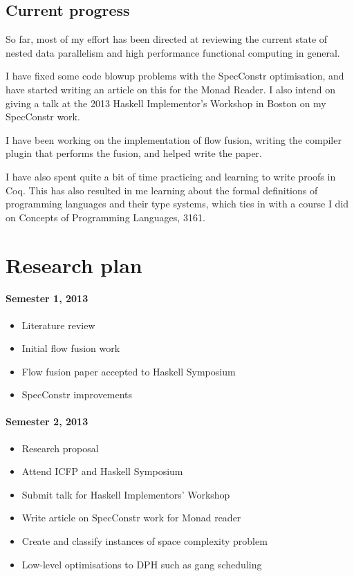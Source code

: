 \documentclass[12pt,a4paper]{article}
\begin{document}
\subsection{Current progress}

So far, most of my effort has been directed at reviewing the current state of nested data parallelism and high performance functional computing in general.

I have fixed some code blowup problems with the SpecConstr optimisation, and have started writing an article on this for the Monad Reader.
I also intend on giving a talk at the 2013 Haskell Implementor's Workshop in Boston on my SpecConstr work.

I have been working on the implementation of flow fusion, writing the compiler plugin that performs the fusion, and helped write the paper\cite{lippmeier2013flow}.

I have also spent quite a bit of time practicing and learning to write proofs in Coq.
This has also resulted in me learning about the formal definitions of programming languages and their type systems\cite{harper2012practical},
which ties in with a course I did on Concepts of Programming Languages, 3161.

\pagebreak
\section{Research plan}

\paragraph{Semester 1, 2013}
\begin{itemize}
\item Literature review
\item Initial flow fusion work
\item Flow fusion paper accepted to Haskell Symposium\cite{lippmeier2013flow}
\item SpecConstr improvements
\end{itemize}

\paragraph{Semester 2, 2013}
\begin{itemize}
\item Research proposal
\item Attend ICFP and Haskell Symposium
\item Submit talk for Haskell Implementors' Workshop
\item Write article on SpecConstr work for Monad reader
\item Create and classify instances of space complexity problem
\item Low-level optimisations to DPH such as gang scheduling
\end{itemize}
\end{document}
